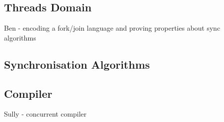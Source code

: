 \subsection{Threads Domain}
Ben - encoding a fork/join language and proving properties about sync algorithms

\subsection{Synchronisation Algorithms}

\subsection{Compiler}
Sully - concurrent compiler
